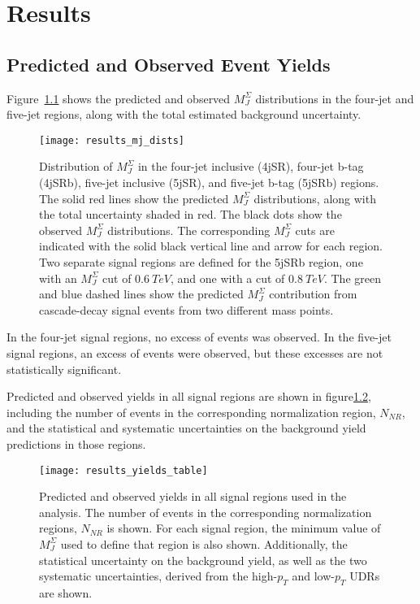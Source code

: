 \chapter{Results} \label{ch:results}

\section{Predicted and Observed Event Yields}\label{sec:results_yields}

Figure~\ref{fig:results_mj_dists} shows the predicted and observed $M_J^{\Sigma}$ distributions in the
four-jet and five-jet regions, along with the total estimated background uncertainty.

\begin{figure}[!ht]
    \centering
\texttt{[image: results\_mj\_dists]}
\caption{Distribution of $M_J^{\Sigma}$ in the four-jet inclusive (4jSR), four-jet b-tag (4jSRb), five-jet inclusive
(5jSR), and five-jet b-tag (5jSRb) regions.
The solid red lines show the predicted $M_J^{\Sigma}$ distributions, along with the total uncertainty shaded in red.
The black dots show the observed $M_J^{\Sigma}$ distributions.
The corresponding $M_J^{\Sigma}$ cuts are indicated with the solid black vertical line and arrow for each region.
Two separate signal regions are defined for the 5jSRb region, one with an $M_J^{\Sigma}$ cut of $0.6~TeV$,
and one with a cut of $0.8~TeV$.
The green and blue dashed lines show the predicted $M_J^{\Sigma}$ contribution from cascade-decay signal events
from two different mass points.
}
\label{fig:results_mj_dists}
\end{figure}

In the four-jet signal regions, no excess of events was observed.
In the five-jet signal regions, an excess of events were observed, but these excesses are not statistically
significant.

Predicted and observed yields in all signal regions are shown in figure\ref{fig:results_yields_table},
including the number of events in the corresponding normalization region, $N_{NR}$, and the statistical and systematic
uncertainties on the background yield predictions in those regions.

\begin{figure}[!ht]
    \centering
\texttt{[image: results\_yields\_table]}
\caption{Predicted and observed yields in all signal regions used in the analysis.
The number of events in the corresponding normalization regions, $N_{NR}$ is shown.
For each signal region, the minimum value of $M_J^{\Sigma}$ used to define that region is also shown.
Additionally, the statistical uncertainty on the background yield, as well as the two systematic uncertainties,
derived from the high-$p_T$ and low-$p_T$ UDRs are shown.}
\label{fig:results_yields_table}
\end{figure}

